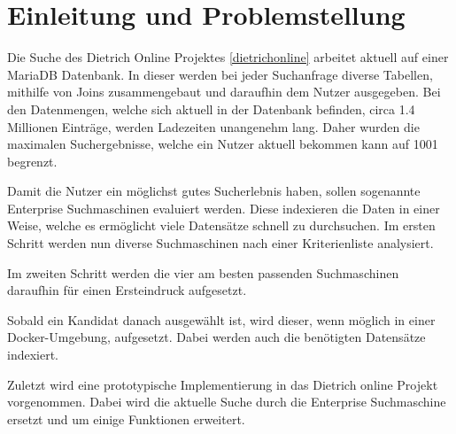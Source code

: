 \chapter{Einleitung und Problemstellung}


Die Suche des Dietrich Online Projektes \ref{dietrichonline} arbeitet aktuell auf einer MariaDB Datenbank. In dieser werden bei jeder Suchanfrage diverse Tabellen, mithilfe von Joins zusammengebaut und daraufhin dem Nutzer ausgegeben. Bei den Datenmengen, welche sich aktuell in der Datenbank befinden, circa 1.4 Millionen Einträge, werden Ladezeiten unangenehm lang. Daher wurden die maximalen Suchergebnisse, welche ein Nutzer aktuell bekommen kann auf 1001 begrenzt. 

Damit die Nutzer ein möglichst gutes Sucherlebnis haben, sollen sogenannte Enterprise Suchmaschinen evaluiert werden. Diese indexieren die Daten in einer Weise, welche es ermöglicht viele Datensätze schnell zu durchsuchen. Im ersten Schritt werden nun diverse Suchmaschinen nach einer Kriterienliste analysiert.

Im zweiten Schritt werden die vier am besten passenden Suchmaschinen daraufhin für einen Ersteindruck aufgesetzt.

Sobald ein Kandidat danach ausgewählt ist, wird dieser, wenn möglich in einer Docker-Umgebung, aufgesetzt. Dabei werden auch die benötigten Datensätze indexiert.

Zuletzt wird eine prototypische Implementierung in das Dietrich online Projekt vorgenommen. Dabei wird die aktuelle Suche durch die Enterprise Suchmaschine ersetzt und um einige Funktionen erweitert. 